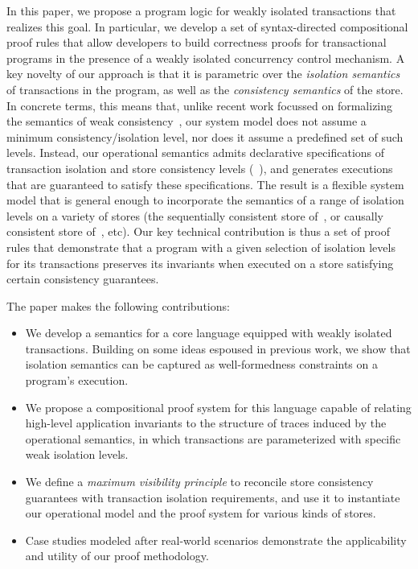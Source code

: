 
In this paper, we propose a program logic for weakly isolated
transactions that realizes this goal.  In particular, we develop a set
of syntax-directed compositional proof rules that allow developers to
build correctness proofs for transactional programs in the presence of
a weakly isolated concurrency control mechanism.  A key novelty of our
approach is that it is parametric over the \emph{isolation semantics}
of transactions in the program, as well as the \emph{consistency
  semantics} of the store. In concrete terms, this means that, unlike
recent work focussed on formalizing the semantics of weak
consistency~\cite{gotsmanpopl16, redblueatc, ecinec}, our system model
does not assume a minimum consistency/isolation level, nor does it
assume a predefined set of such levels.  Instead, our operational
semantics admits declarative specifications of transaction isolation
and store consistency levels (\eg~\cite{pldi15,gotsmanconcur15}), and
generates executions that are guaranteed to satisfy these
specifications. The result is a flexible system model that is general
enough to incorporate the semantics of a range of isolation levels on
a variety of stores (\eg the sequentially consistent store
of~\cite{adyaphd}, or causally consistent store
of~\cite{gotsmanpopl16}, etc).  Our key technical contribution is thus
a set of proof rules that demonstrate that a program with a given
selection of isolation levels for its transactions preserves its
invariants when executed on a store satisfying certain consistency
guarantees.

The paper makes the following contributions:
\begin{itemize}
  \item We develop a semantics for a core language equipped with
    weakly isolated transactions.  Building on some ideas espoused in
    previous work, we show that isolation semantics can be captured as
    well-formedness constraints on a program's execution.
  \item We propose a compositional proof system for this language
    capable of relating high-level application invariants to the structure
    of traces induced by the operational semantics, in which transactions
    are parameterized with specific weak isolation levels.
  \item We define a \emph{maximum visibility principle} to reconcile
    store consistency guarantees with transaction isolation
    requirements, and use it to instantiate our operational model and
    the proof system for various kinds of stores.
  \item Case studies modeled after real-world scenarios demonstrate
    the applicability and utility of our proof methodology.
\end{itemize}

